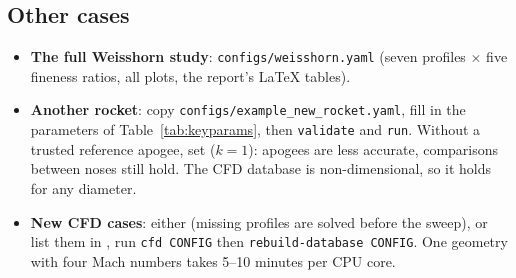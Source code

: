 \subsection{Other cases}
\label{sec:newrocket}
\label{sec:newcfd}

\begin{itemize}[leftmargin=*,itemsep=2pt]
\item \textbf{The full Weisshorn study}: \texttt{configs/weisshorn.yaml} (seven profiles $\times$ five fineness
ratios, all plots, the report's LaTeX tables).
\item \textbf{Another rocket}: copy \texttt{configs/example\_new\_rocket.yaml}, fill in the parameters of
Table~\ref{tab:keyparams}, then \texttt{validate} and \texttt{run}. Without a trusted reference apogee, set
 ($k = 1$): apogees are less accurate, comparisons between noses still hold. The CFD
database is non-dimensional, so it holds for any diameter.
\item \textbf{New CFD cases}: either  (missing profiles are solved before
the sweep), or list them in , run \texttt{cfd CONFIG} then \texttt{rebuild-database CONFIG}. One
geometry with four Mach numbers takes 5--10 minutes per CPU core.
\end{itemize}
